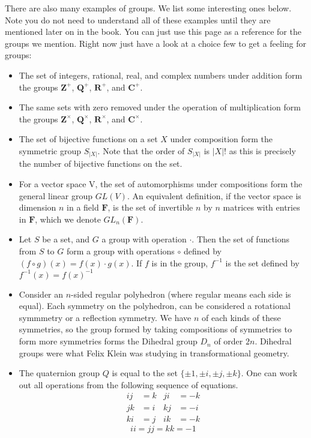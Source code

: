 \documentclass[12pt]{report}
\begin{document}
There are also many examples of groups. We list some interesting ones below. Note you do not need to understand all of these examples until they are mentioned later on in the book. You can just use this page as a reference for the groups we mention. Right now just have a look at a choice few to get a feeling for groups:
\begin{itemize}
    \item The set of integers, rational, real, and complex numbers under addition form the groups $\mathbf{Z}^+$, $\mathbf{Q}^+$, $\mathbf{R}^+$, and $\mathbf{C}^+$.
    \item The same sets with zero removed under the operation of multiplication form the groups $\mathbf{Z}^\times$, $\mathbf{Q}^\times$, $\mathbf{R}^\times$, and $\mathbf{C}^\times$.
    \item The set of bijective functions on a set $X$ under composition form the symmetric group $S_{|X|}$. Note that the order of $S_{|X|}$ is $|X|!$ as this is precisely the number of bijective functions on the set.
    \item For a vector space V, the set of automorphisms under compositions form the general linear group $GL(V)$. An equivalent definition, if the vector space is dimension $n$ in a field $\mathbf{F}$, is the set of invertible $n$ by $n$ matrices with entries in $\mathbf{F}$, which we denote $GL_n(\mathbf{F})$.
    \item Let $S$ be a set, and $G$ a group with operation $\cdotp$. Then the set of functions from $S$ to $G$ form a group with operations $\circ$ defined by $(f \circ g)(x) = f(x) \cdotp g(x)$. If $f$ is in the group, $f^{-1}$ is the set defined by $f^{-1}(x) = f(x)^{-1}$
    \item Consider an $n$-sided regular polyhedron (where regular means each side is equal). Each symmetry on the polyhedron, can be considered a rotational symmmetry or a reflection symmetry. We have $n$ of each kinds of these symmetries, so the group formed by taking compositions of symmetries to form more symmetries forms the Dihedral group $D_n$ of order $2n$. Dihedral groups were what Felix Klein was studying in transformational geometry.
    \item The quaternion group $Q$ is equal to the set $\{ \pm 1, \pm i, \pm j, \pm k \}$. One can work out all operations from the following sequence of equations.
    \begin{align*}
                   ij &= k & ji &= -k\\
                   jk &= i & kj &= -i\\
                   ki &= j & ik &= -k
    \end{align*}
    \[ii = jj = kk = -1\]


\end{itemize}
\end{document}
